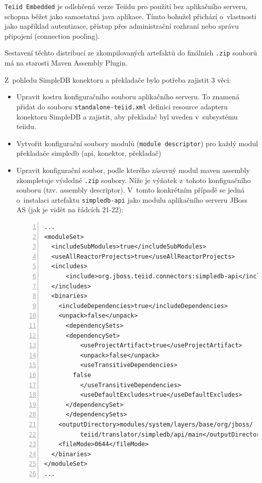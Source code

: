 \documentclass[oneside,12pt]{fithesis2}
\begin{document}
\texttt{Teiid Embedded} je odlehčená verze Teiidu pro použití bez aplikačního serveru, schopna běžet jako samostatná java aplikace. Tímto bohužel přichází o~vlastnosti jako například autentizace, přístup přes administrační rozhraní  nebo správu připojení (connection pooling).

Sestavení těchto distribucí ze zkompilovaných artefaktů do finálních \texttt{.zip} souborů má na starosti Maven Assembly Plugin. 

Z~pohledu SimpleDB konektoru a překladače bylo potřeba zajistit 3 věci:

\begin{itemize}
 \item Upravit kostru konfiguračního souboru aplikačního serveru. To znamená přidat do souboru \texttt{standalone-teiid.xml} definici resource adapteru konektoru SimpleDB a zajistit, aby překladač byl uveden v~subsystému teiidu.
 \item Vytvořit konfigurační soubory modulů (\texttt{module descriptor}) pro každý modul překladače simpledb (api, konektor, překladač)
 \item Upravit konfigurační soubor, podle kterého zásuvný modul maven assembly zkompletuje výsledné \texttt{.zip} soubory. Níže je výňatek z~tohoto konfiguačního souboru (tzv. assembly descriptor). V~tomto konkrétním případě se jedná o~instalaci artefaktu \texttt{simpledb-api} jako modulu aplikačního serveru JBoss AS (jak je vidět na řádcích 21-22):
 \begin{Verbatim}[fontsize=\small,numbers=left]
...
<moduleSet>
  <includeSubModules>true</includeSubModules>
  <useAllReactorProjects>true</useAllReactorProjects>
  <includes>
      <include>org.jboss.teiid.connectors:simpledb-api</include>
  </includes>
  <binaries>        
    <includeDependencies>true</includeDependencies>
    <unpack>false</unpack>
      <dependencySets>
	  <dependencySet>
	      <useProjectArtifact>true</useProjectArtifact>
	      <unpack>false</unpack>
	      <useTransitiveDependencies>
		false
	      </useTransitiveDependencies>
	      <useDefaultExcludes>true</useDefaultExcludes>
	  </dependencySet>
      </dependencySets>          
    <outputDirectory>modules/system/layers/base/org/jboss/
	      teiid/translator/simpledb/api/main</outputDirectory>
    <fileMode>0644</fileMode>
  </binaries>
</moduleSet>  
...
\end{Verbatim}
    
\end{itemize}
\end{document}
